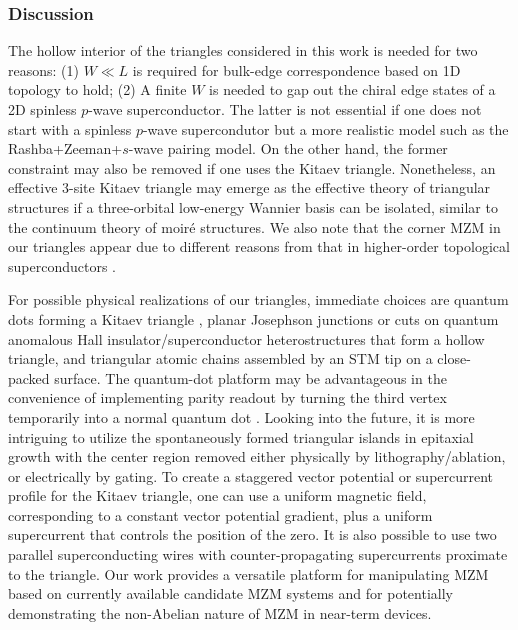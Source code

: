 \subsubsection{Discussion}
The hollow interior of the triangles considered in this work is needed for two reasons: (1) $W\ll L$ is required for bulk-edge correspondence based on 1D topology to hold; (2) A finite $W$ is needed to gap out the chiral edge states of a 2D spinless $p$-wave superconductor. The latter is not essential if one does not start with a spinless $p$-wave supercondutor but a more realistic model such as the Rashba+Zeeman+$s$-wave pairing model. On the other hand, the former constraint may also be removed if one uses the Kitaev triangle. Nonetheless, an effective 3-site Kitaev triangle may emerge as the effective theory of triangular structures if a three-orbital low-energy Wannier basis can be isolated, similar to the continuum theory of moir\'{e} structures. We also note that the corner MZM in our triangles appear due to different reasons from that in higher-order topological superconductors \cite{wangEvidenceMajoranaBound2018,pahomiBraidingMajoranaCorner2020,zhangsb_2020_1,zhangsb_2020_2}.

For possible physical realizations of our triangles, immediate choices are quantum dots forming a Kitaev triangle \cite{dvirRealizationMinimalKitaev2023}, planar Josephson junctions or cuts on quantum anomalous Hall insulator/superconductor heterostructures \cite{xieCreatingLocalizedMajorana2021} that form a hollow triangle, and triangular atomic chains assembled by an STM tip \cite{schneiderPrecursorsMajoranaModes2022} on a close-packed surface. The quantum-dot platform may be advantageous in the convenience of implementing parity readout by turning the third vertex temporarily into a normal quantum dot \cite{mishmashDephasingLeakageDynamics2020,parity_QD_readout_2020, fengProbingRobustMajorana2022}. Looking into the future, it is more intriguing to utilize the spontaneously formed triangular islands in epitaxial growth \cite{pietzschSpinResolvedElectronicStructure2006} with the center region removed either physically by lithography/ablation, or electrically by gating. To create a staggered vector potential or supercurrent profile for the Kitaev triangle, one can use a uniform magnetic field, corresponding to a constant vector potential gradient, plus a uniform supercurrent that controls the position of the zero. It is also possible to use two parallel superconducting wires with counter-propagating supercurrents proximate to the triangle. Our work provides a versatile platform for manipulating MZM based on currently available candidate MZM systems and for potentially demonstrating the non-Abelian nature of MZM in near-term devices.
